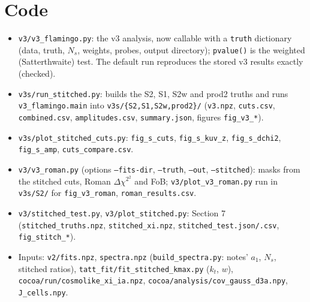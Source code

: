 \documentclass[11pt]{article}
\newcommand{\dchi}{\Delta\chi^2}
\begin{document}
\section{Code}
\begin{itemize}\sloppy
\item \texttt{v3/v3\_flamingo.py}: the v3 analysis, now callable with a
  \texttt{truth} dictionary (data, truth, $N_s$, weights, probes, output
  directory); \texttt{pvalue()} is the weighted (Satterthwaite) test. The
  default run reproduces the stored v3 results exactly (checked).
\item \texttt{v3s/run\_stitched.py}: builds the S2, S1, S2w and prod2 truths
  and runs \texttt{v3\_flamingo.main} into \texttt{v3s/\{S2,S1,S2w,prod2\}/}
  (\texttt{v3.npz}, \texttt{cuts.csv}, \texttt{combined.csv},
  \texttt{amplitudes.csv}, \texttt{summary.json}, figures
  \texttt{fig\_v3\_*}).
\item \texttt{v3s/plot\_stitched\_cuts.py}: \texttt{fig\_s\_cuts},
  \texttt{fig\_s\_kuv\_z}, \texttt{fig\_s\_dchi2}, \texttt{fig\_s\_amp},
  \texttt{cuts\_compare.csv}.
\item \texttt{v3/v3\_roman.py} (options \texttt{--fits-dir}, \texttt{--truth},
  \texttt{--out}, \texttt{--stitched}): masks from the stitched cuts, Roman
  $\dchi^2$ and FoB; \texttt{v3/plot\_v3\_roman.py} run in
  \texttt{v3s/S2/} for \texttt{fig\_v3\_roman}, \texttt{roman\_results.csv}.
\item \texttt{v3/stitched\_test.py}, \texttt{v3/plot\_stitched.py}: Section 7
  (\texttt{stitched\_truths.npz}, \texttt{stitched\_xi.npz},
  \texttt{stitched\_test.json/.csv}, \texttt{fig\_stitch\_*}).
\item Inputs: \texttt{v2/fits.npz}, \texttt{spectra.npz}
  (\texttt{build\_spectra.py}: notes' $a_1$, $N_s$, stitched ratios),
  \texttt{tatt\_fit/fit\_stitched\_kmax.py} ($k_t$, $w$),
  \texttt{cocoa/run/cosmolike\_xi\_ia.npz},
  \texttt{cocoa/analysis/cov\_gauss\_d3a.npy}, \texttt{J\_cells.npy}.
\end{itemize}
\end{document}
